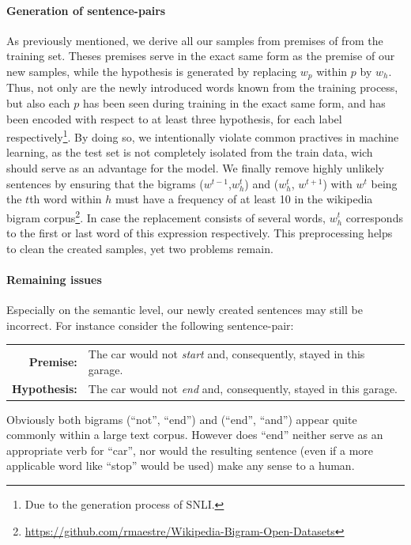 \paragraph*{Generation of sentence-pairs}
As previously mentioned, we derive all our samples from premises of from the training set. Theses premises serve in the exact same form as the premise of our new samples, while the hypothesis is generated by replacing $w_p$ within $p$ by $w_h$. Thus, not only are the newly introduced words known from the training process, but also each $p$ has been seen during training in the exact same form, and has been encoded with respect to at least three hypothesis, for each label respectively\footnote{Due to the generation process of \ac{SNLI}.}. By doing so, we intentionally violate common practives in machine learning, as the test set is not completely isolated from the train data, wich should serve as an advantage for the model. We finally remove highly unlikely sentences by ensuring that the bigrams  ($w^{t-1}$,$w_h^t$) and ($w_h^t$, $w^{t+1}$) with $w^t$ being the $t$th word within $h$ must have a frequency of at least 10 in the wikipedia bigram corpus\footnote{\href{https://github.com/rmaestre/Wikipedia-Bigram-Open-Datasets}{https://github.com/rmaestre/Wikipedia-Bigram-Open-Datasets}}. In case the replacement consists of several words, $w^t_h$ corresponds to the first or last word of this expression respectively. This preprocessing helps to clean the created samples, yet two problems remain.

\paragraph*{Remaining issues}

Especially on the semantic level, our newly created sentences may still be incorrect. For instance consider the following sentence-pair:
\begin{center}
\begin{tabular}{rl}
\textbf{Premise:} & The car would not \textit{start} and, consequently, stayed in this garage. \\
\textbf{Hypothesis:} & The car would not \textit{end} and, consequently, stayed in this garage.
\end{tabular}
\end{center}
Obviously both bigrams (``not'', ``end'') and (``end'', ``and'') appear quite commonly within a large text corpus. However does ``end'' neither serve as an appropriate verb for ``car'', nor would the resulting sentence (even if a more applicable word like ``stop'' would be used) make any sense to a human.
\newline

